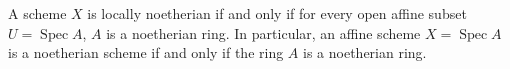 A scheme $X$ is locally noetherian if and only if for every open affine subset $U = \operatorname{Spec} A$, $A$ is a noetherian ring. In particular, an affine scheme $X = \operatorname{Spec} A$ is a noetherian scheme if and only if the ring $A$ is a noetherian ring.
